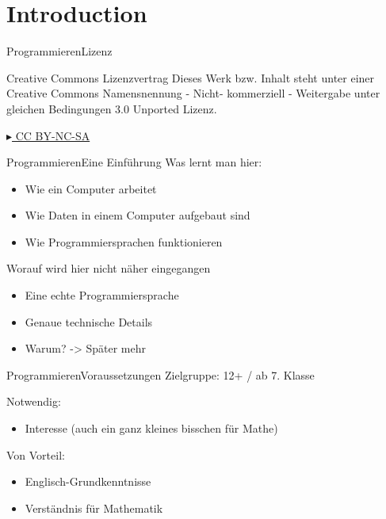 


\section{Introduction}

\begin{frame}{Programmieren}{Lizenz}

	\begin{block}{Creative Commons Lizenzvertrag}
     Dieses Werk bzw. Inhalt steht unter einer Creative Commons Namensnennung - Nicht-	kommerziell - Weitergabe unter gleichen Bedingungen 3.0 Unported Lizenz.
	\end{block}
	\begin{center}
	\href{http://creativecommons.org/licenses/by-nc-sa/3.0/deed.de}{$\blacktriangleright$ CC BY-NC-SA}
	\end{center}
\end{frame}


\begin{frame}{Programmieren}{Eine Einführung}
	Was lernt man hier:
	\begin{itemize}
	\item Wie ein Computer arbeitet
	\item Wie Daten in einem Computer aufgebaut sind
	\item Wie Programmiersprachen funktionieren
	\end{itemize}
	\vspace*{0.3cm}
	
	Worauf wird hier nicht näher eingegangen
	\begin{itemize}
	\item Eine echte Programmiersprache 
	\item Genaue technische Details
	\item Warum? -> Später mehr
	\end{itemize}
\end{frame}


\begin{frame}{Programmieren}{Voraussetzungen}
	Zielgruppe: 12+ / ab 7. Klasse

	Notwendig:
	\begin{itemize}
	\item Interesse (auch ein ganz kleines bisschen für Mathe)
	\end{itemize}
	\vspace*{0.3cm}
	
	Von Vorteil:
	\begin{itemize}
	\item Englisch-Grundkenntnisse
	\item Verständnis für Mathematik
	\end{itemize}
\end{frame}

